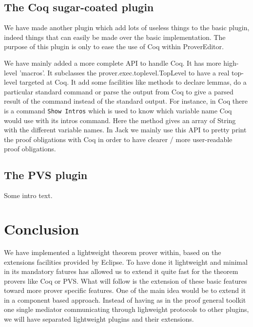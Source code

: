 \documentclass{llncs}
\begin{document}
\subsection{The Coq sugar-coated plugin}
\label{subsec:coq-sugar-coated}

We have made another plugin which add lots of useless things to the 
basic plugin,
indeed things that can easily be made over the basic implementation.
The purpose of this plugin is only to ease the use of Coq within ProverEditor.

We have mainly added a more complete API to handle Coq. 
It has more high-level 'macros'. 
It subclasses the prover.exec.toplevel.TopLevel to have a real top-level
targeted at Coq. It add some facilities like methods to declare lemmas, 
do a particular standard command or parse the output from Coq to give 
a parsed result of the command instead of the standard output. 
For instance, in Coq there is a command {\tt Show Intros} which
is used to know which variable name Coq would use with its  intros command. 
Here the method gives an array of String with the different variable names.
In Jack we mainly use this API to pretty print the proof obligations with 
Coq in order to have clearer / more user-readable proof obligations.

\subsection{The PVS plugin}
\label{subsec:pvs-plugin}

Some intro text. %

\section{Conclusion}
\label{sec:conclusion}

We have implemented a lightweight theorem prover within, 
based on the extensions facilities provided by Eclipse. 
To have done it lightweight and minimal in its mandatory
fatures has allowed us to extend it quite fast for the theorem 
provers like Coq or PVS.
What will follow is the extension of these basic features toward more prover 
specific features.
One of the main idea would be to extend it in a component based approach.
Instead of having as in the proof general toolkit one single 
mediator communicating through lighweight protocols to other plugins, 
we will have separated lightweight plugins and their extensions.
\end{document}
